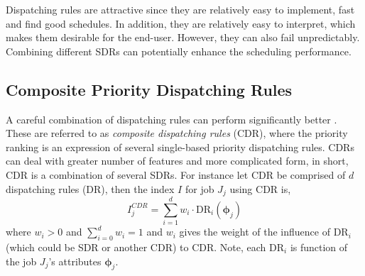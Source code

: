 \documentclass[smallextended]{svjour3}
\renewcommand{\vphi}{\bm \phi}
\begin{document}

Dispatching rules are attractive since they are relatively easy to implement, 
fast and find good schedules. In addition, they are relatively easy to 
interpret, which makes them desirable for the end-user.
However, they can also fail unpredictably. 
Combining different SDRs can potentially enhance the scheduling performance. 

\subsection{Composite Priority Dispatching Rules}\label{sec:CDR}
A careful combination of dispatching rules can perform significantly better 
\cite{Jayamohan04}. These are referred to as \emph{composite dispatching rules} 
(CDR), where the priority ranking is an expression of several single-based 
priority dispatching rules. CDRs can deal with greater number of features and 
more complicated form, in short, CDR is a combination of several SDRs. For 
instance let CDR be comprised of $d$ dispatching rules (DR), then the index $I$ 
for job $J_j$ using CDR is, 
\begin{equation}
	I_j^{CDR} = \sum_{i=1}^d w_i \cdot \text{DR}_i(\vphi_j) \label{eq:CDR}
\end{equation}
where $w_i>0$ and $\sum_{i=0}^d w_i = 1$ and $w_i$ gives the weight of the 
influence of $\text{DR}_i$ (which could be SDR or another CDR) to CDR. Note, 
each $\text{DR}_i$ is function of the job $J_j$'s attributes $\vphi_j$.  

\end{document}
